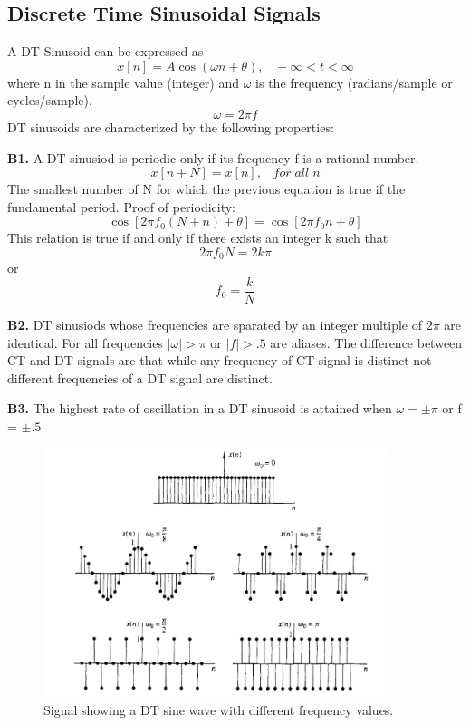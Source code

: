 \documentclass{article} %
\begin{document}
    \subsection{Discrete Time Sinusoidal Signals}
    A DT Sinusoid can be expressed as
    \begin{equation}  
	x[n] = A \cos(\omega n + \theta), \;\;\; -\infty < t < \infty
    \end{equation}
    where n in the sample value (integer) and $\omega$ is the frequency (radians/sample or cycles/sample).
    \begin{equation}  
	\omega = 2 \pi f
    \end{equation}
	DT sinusoids are characterized by the following properties:
	
	\textbf{B1.} A DT sinusiod is periodic only if its frequency f is a rational number.
	\begin{equation}  
	x[n + N] = x[n], \;\;\; for \; all\; n
    \end{equation}
    The smallest number of N for which the previous equation is true if the fundamental period. Proof of periodicity:
    \begin{equation}  
	\cos[2 \pi f_0 (N + n) + \theta] = \cos[2 \pi f_0 n + \theta]
    \end{equation}
    This relation is true if and only if there exists an integer k such that
    \begin{equation}  
	2 \pi f_0 N = 2k \pi
    \end{equation}
    or 
    \begin{equation}  
	f_0 = \frac{k}{N}
    \end{equation}
    
    \textbf{B2.} DT sinusiods whose frequencies are sparated by an integer multiple of $2\pi$ are identical. For all frequencies $|\omega| > \pi$ or $|f| > .5$ are aliases. The difference between CT and DT signals are that while any frequency of CT signal is distinct not different frequencies of a DT signal are distinct.
    
    \textbf{B3.} The highest rate of oscillation in a DT sinusoid is attained when $\omega = \pm \pi$ or f = $\pm.5$
    \begin{figure}[h]
    \centering
	\includegraphics[width=10cm]{dt_freq}
	\caption{Signal showing a DT sine wave with different frequency values.}
	\end{figure}
	
\end{document}
